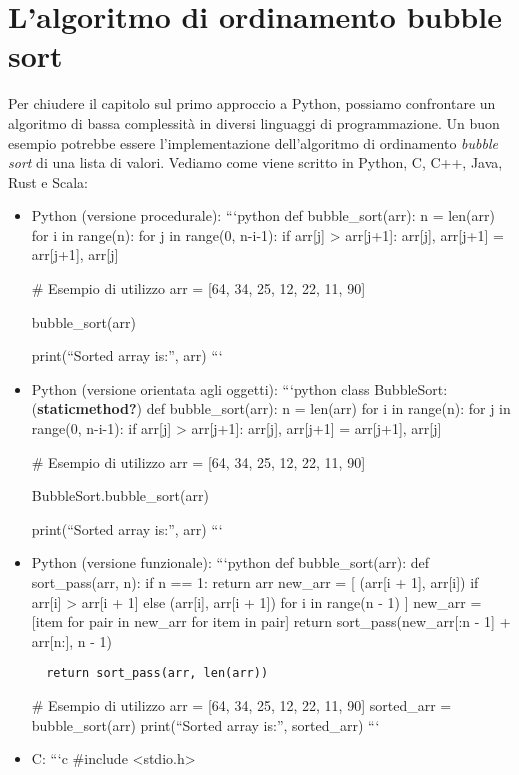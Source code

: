 \documentclass[
  letterpaper,
  DIV=11,
  numbers=noendperiod]{scrreprt}
\begin{document}
\section{L'algoritmo di ordinamento bubble
sort}\label{lalgoritmo-di-ordinamento-bubble-sort}

Per chiudere il capitolo sul primo approccio a Python, possiamo
confrontare un algoritmo di bassa complessità in diversi linguaggi di
programmazione. Un buon esempio potrebbe essere l'implementazione
dell'algoritmo di ordinamento \emph{bubble sort} di una lista di valori.
Vediamo come viene scritto in Python, C, C++, Java, Rust e Scala:

\begin{itemize}
\item
  Python (versione procedurale): ```python def bubble\_sort(arr): n =
  len(arr) for i in range(n): for j in range(0, n-i-1): if arr{[}j{]}
  \textgreater{} arr{[}j+1{]}: arr{[}j{]}, arr{[}j+1{]} = arr{[}j+1{]},
  arr{[}j{]}

  \# Esempio di utilizzo arr = {[}64, 34, 25, 12, 22, 11, 90{]}

  bubble\_sort(arr)

  print(``Sorted array is:'', arr) ```
\item
  Python (versione orientata agli oggetti): ```python class BubbleSort:
  (\textbf{staticmethod?}) def bubble\_sort(arr): n = len(arr) for i in
  range(n): for j in range(0, n-i-1): if arr{[}j{]} \textgreater{}
  arr{[}j+1{]}: arr{[}j{]}, arr{[}j+1{]} = arr{[}j+1{]}, arr{[}j{]}

  \# Esempio di utilizzo arr = {[}64, 34, 25, 12, 22, 11, 90{]}

  BubbleSort.bubble\_sort(arr)

  print(``Sorted array is:'', arr) ```
\item
  Python (versione funzionale): ```python def bubble\_sort(arr): def
  sort\_pass(arr, n): if n == 1: return arr new\_arr = {[} (arr{[}i +
  1{]}, arr{[}i{]}) if arr{[}i{]} \textgreater{} arr{[}i + 1{]} else
  (arr{[}i{]}, arr{[}i + 1{]}) for i in range(n - 1) {]} new\_arr =
  {[}item for pair in new\_arr for item in pair{]} return
  sort\_pass(new\_arr{[}:n - 1{]} + arr{[}n:{]}, n - 1)

\begin{verbatim}
  return sort_pass(arr, len(arr))
\end{verbatim}

  \# Esempio di utilizzo arr = {[}64, 34, 25, 12, 22, 11, 90{]}
  sorted\_arr = bubble\_sort(arr) print(``Sorted array is:'',
  sorted\_arr) ```
\item
  C: ```c \#include \textless stdio.h\textgreater{}


\end{itemize}
\end{document}
